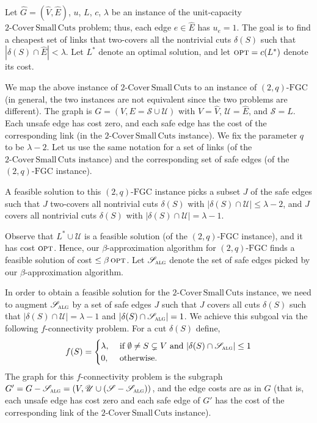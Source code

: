 \documentclass[11pt]{article}
\newcommand{\opt}{\textsc{opt}}
\newcommand{\safe}{\mathscr{S}}
\newcommand{\unsafe}{\mathscr{U}}
\newcommand{\fgc}{\mathrm{FGC}}
\newcommand{\J}{{J}}
\newcommand{\alg}{\textsc{alg}}
\newcommand{\twoqfgc}{(2,q)\text{-}\fgc}
\newcommand\capbound{\lambda}
\newcommand\hG{\hat{G}}
\newcommand\hE{\hat{E}}
\newcommand\hV{\hat{V}}
\newcommand\twoASC{\mathrm{2\text{-}Cover\,Small\,Cuts}}
\begin{document}
{{Let $\hG=(\hV,\hE)$, $u$, $L$, $c$, $\capbound$ be an instance of
the unit-capacity $\twoASC$ problem; thus, each edge $e\in\hE$ has $u_e=1$.
The goal is to find a cheapest set of links that two-covers all the
nontrivial cuts $\delta(S)$ such that $|\delta(S)\cap\hE| <\capbound$.
Let $L^*$ denote an optimal solution, and let $\opt=c(L^*)$ denote its cost.


We map the above instance of $\twoASC$ to an instance of $\twoqfgc$ (in general, the two instances are not equivalent since the two problems are different).
The graph is $G=(V, E=\safe\cup\unsafe)$ with  $V=\hV$, $\unsafe=\hE$, and $\safe = L$.
Each unsafe edge has cost zero, and each safe edge has the cost of
the corresponding link (in the $\twoASC$ instance).
We fix the parameter $q$ to be $\capbound-2$.
Let us use the same notation for a set of links (of the $\twoASC$ instance)
and the corresponding set of safe edges (of the $\twoqfgc$ instance).

A feasible solution to this $\twoqfgc$ instance picks a subset $\J$
of the safe edges such that $\J$ two-covers all nontrivial cuts
$\delta(S)$ with $|\delta(S)\cap \unsafe| \leq \capbound-2$, and
$\J$ covers all nontrivial cuts $\delta(S)$ with $|\delta(S)\cap\unsafe|=\capbound-1$.

Observe that $L^*\cup\unsafe$ is a feasible solution (of the $\twoqfgc$ instance),
and it has cost $\opt$.
Hence, our $\beta$-approximation algorithm for $\twoqfgc$ finds
a feasible solution of cost $\leq\beta\,\opt$.
Let $\safe_{\alg}$ denote the set of safe edges picked by our
$\beta$-approximation algorithm.

In order to obtain a feasible solution for the $\twoASC$ instance,
we need to augment $\safe_{\alg}$ by a set of safe edges $\J$ such
that $\J$ covers all cuts $\delta(S)$ such that
$|\delta(S)\cap\unsafe|=\capbound-1$ and $|\delta(S)\cap\safe_{\alg}|=1$.
We achieve this subgoal via the following $f$-connectivity problem.
For a cut $\delta(S)$ define,
\[
f(S) = \begin{cases}
    \capbound , &\text{ if } \emptyset\neq{S}\subsetneq{V} \text{ and } |\delta(S)\cap \safe_{\alg}| \leq 1 \\ 0, &\text{ otherwise}.
\end{cases}
\]
The graph for this $f$-connectivity problem is the subgraph $G' =
G - \safe_{\alg} = (V,\unsafe\cup (\safe - \safe_{\alg}))$, and the
edge costs are as in $G$ (that is, each unsafe edge has cost zero
and each safe edge of $G'$ has the cost of the corresponding link
of the $\twoASC$ instance).


}}
\end{document}
